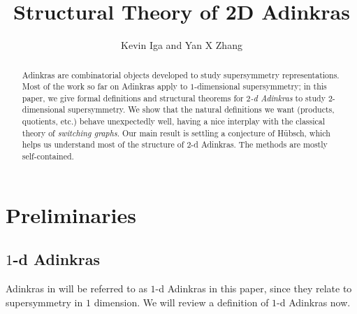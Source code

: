 \documentclass[12pt,twoside,singlespace]{article}
\title{Structural Theory of 2D Adinkras}
\author{Kevin Iga and Yan X Zhang}
\numberwithin{equation}{section}
\theoremstyle{definition}
\begin{document}
\pagestyle{plain}

\maketitle

\begin{abstract}
Adinkras are combinatorial objects developed to study supersymmetry representations. Most of the work so far on Adinkras apply to $1$-dimensional supersymmetry; in this paper, we give formal definitions and structural theorems for \emph{$2$-d Adinkras} to study $2$-dimensional supersymmetry. We show that the natural definitions we want (products, quotients, etc.) behave unexpectedly well, having a nice interplay with the classical theory of \emph{switching graphs}. Our main result is settling a conjecture of H\"ubsch, which helps us understand most of the structure of $2$-d Adinkras. The methods are mostly self-contained.
\end{abstract}

\section{Preliminaries}

\subsection{$1$-d Adinkras}
Adinkras in \cite{d2l:first,d2l:graph-theoretic,zhang:adinkras} will be referred to as $1$-d Adinkras in this paper, since they relate to supersymmetry in $1$ dimension.  We will review a definition of $1$-d Adinkras now.
\end{document}
